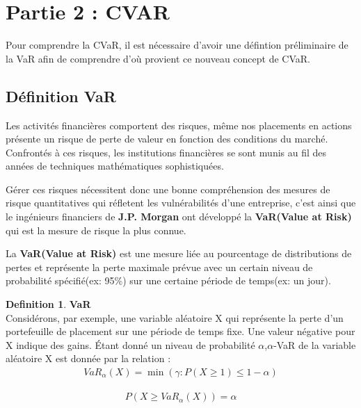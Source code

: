 \documentclass[12pt]{article}
\theoremstyle{definition}
\newtheorem{definition}{Definition}[section]
\theoremstyle{definition}
\begin{document}
\newpage
\section{Partie 2 : CVAR}
Pour comprendre la CVaR, il est nécessaire d'avoir une défintion préliminaire de la VaR afin de comprendre d'où provient ce nouveau concept de CVaR.

\subsection{Définition VaR}
Les activités financières comportent des risques, même nos placements en actions présente 
un risque de perte de valeur en fonction des conditions du marché. Confrontés à ces risques, les institutions financières se sont munis au fil des années de techniques mathématiques sophistiquées.

Gérer ces risques nécessitent donc une bonne compréhension des mesures de risque quantitatives qui réfletent les vulnérabilités d'une entreprise, c'est ainsi que le ingénieurs financiers de \textbf{J.P. Morgan} ont développé la \textbf{VaR(Value at Risk)} qui est la mesure de risque la plus connue.

La \textbf{VaR(Value at Risk)} est une mesure liée au pourcentage de distributions de pertes et représente la perte maximale prévue avec un certain niveau de probabilité spécifié(ex: 95\%) sur une certaine période de temps(ex: un jour).

\begin{definition}{ \textbf{VaR}} \\
Considérons, par exemple, une variable aléatoire X qui représente la perte d'un portefeuille de placement sur une période de temps fixe. Une valeur négative pour X indique des gains. Étant donné un niveau de probabilité \texttt{$\alpha$},\texttt{$\alpha$}-VaR de la variable aléatoire X est donnée par la relation : 
\boldmath\begin{eqnarray}
VaR_{\alpha}(X) = \min{}(\gamma : P(X\ge1) \leq 1 - \alpha)
\end{eqnarray}
\end{definition}

\boldmath\begin{eqnarray}
P(X\ge VaR_{\alpha}(X)) = \alpha
\end{eqnarray}
\end{document}
